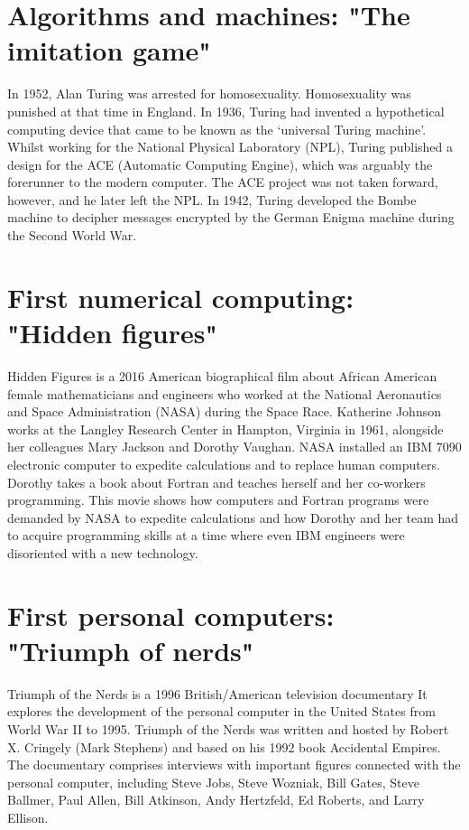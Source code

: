   
  \newpage 
 \section*{Algorithms and machines: "The imitation game"} 
 In 1952, Alan Turing was arrested for homosexuality. 
 Homosexuality was punished at that time in England. 
 In 1936, Turing had invented a hypothetical computing device that came to be known 
 as the ‘universal Turing machine’. 
 Whilst working for the National Physical Laboratory (NPL), 
 Turing published a design for the ACE (Automatic Computing Engine), which was 
 arguably the forerunner to the modern computer. 
 The ACE project was not taken forward, however, and he later left the NPL. 
 In 1942,  Turing developed the Bombe machine to decipher messages encrypted by the German Enigma 
 machine during the Second World War. 
 
   
   
 \section*{First numerical computing: "Hidden figures"}
 Hidden Figures is a 2016 American biographical  film 
 about African American female mathematicians and engineers 
 who worked at the National Aeronautics and Space Administration (NASA) 
 during the Space Race.
 Katherine Johnson works at the Langley Research Center in Hampton, Virginia in 1961, 
 alongside her colleagues Mary Jackson and Dorothy Vaughan. 
 NASA installed an IBM 7090 electronic computer to expedite calculations and to replace human computers. 
 Dorothy takes a book about Fortran and teaches herself and her co-workers programming. 
 This movie shows how computers and Fortran programs were demanded by NASA
 to expedite calculations and how Dorothy and her team had to acquire programming skills 
 at a time where even IBM engineers were disoriented with a new technology. 
 
  
   
  
 \section*{First personal computers: "Triumph of nerds"}
 Triumph of the Nerds is a 1996 British/American television documentary
 It explores the development of the personal computer in the United States from World War II to 1995. 
 Triumph of the Nerds was written and hosted by Robert X. Cringely (Mark Stephens) 
 and based on his 1992 book Accidental Empires. 
 The documentary comprises interviews with important figures connected with the personal computer, 
 including Steve Jobs, Steve Wozniak, Bill Gates, Steve Ballmer, Paul Allen, Bill Atkinson, 
 Andy Hertzfeld, Ed Roberts, and Larry Ellison. 
 
